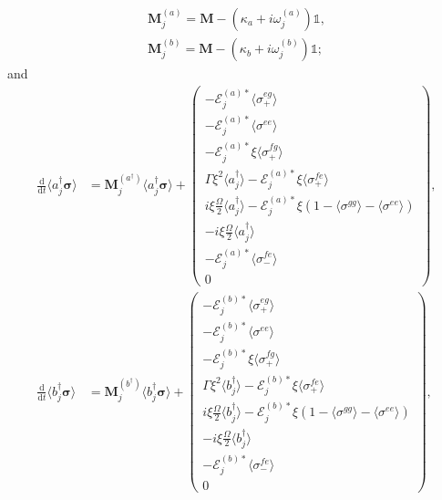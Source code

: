 \documentclass{article}
\newcommand{\ddt}[1][]{\frac{\mathrm{d} #1}{\mathrm{d}t}}
\begin{document}
\begin{subequations}
	\begin{gather}
		\bm{M}^{(a)}_{j} = \bm{M} - \left( \kappa_{a} + i \omega_{j}^{(a)} \right) \mathbb{1}, \\
		\bm{M}^{(b)}_{j} = \bm{M} - \left( \kappa_{b} + i \omega_{j}^{(b)} \right) \mathbb{1};
	\end{gather}
\end{subequations}
and
\begin{subequations}
	\begin{align}
		\ddt \langle a_{j}^{\dagger} \bm{\sigma} \rangle &= \bm{M}_{j}^{(a^{\dagger})} \langle a_{j}^{\dagger} \bm{\sigma} \rangle +
		\begin{pmatrix}
			-\mathcal{E}_{j}^{(a) *} \langle \sigma^{eg}_{+} \rangle \\
			-\mathcal{E}_{j}^{(a) *} \langle \sigma^{ee} \rangle \\
			-\mathcal{E}_{j}^{(a) *} \xi \langle \sigma^{fg}_{+} \rangle \\
			\Gamma \xi^{2} \langle a_{j}^{\dagger} \rangle - \mathcal{E}_{j}^{(a) *} \xi \langle \sigma^{fe}_{+} \rangle \\
			i \xi \frac{\Omega}{2} \langle a_{j}^{\dagger} \rangle - \mathcal{E}_{j}^{(a) *} \xi \left( 1 - \langle \sigma^{gg} \rangle - \langle \sigma^{ee} \rangle \right) \\
			-i \xi \frac{\Omega}{2} \langle a_{j}^{\dagger} \rangle \\
			-\mathcal{E}_{j}^{(a) *} \langle \sigma^{fe}_{-} \rangle \\
			0
		\end{pmatrix} , \\
		\ddt \langle b_{j}^{\dagger} \bm{\sigma} \rangle &= \bm{M}_{j}^{(b^{\dagger})} \langle b_{j}^{\dagger} \bm{\sigma} \rangle +
		\begin{pmatrix}
			-\mathcal{E}_{j}^{(b) *} \langle \sigma^{eg}_{+} \rangle \\
			-\mathcal{E}_{j}^{(b) *} \langle \sigma^{ee} \rangle \\
			-\mathcal{E}_{j}^{(b) *} \xi \langle \sigma^{fg}_{+} \rangle \\
			\Gamma \xi^{2} \langle b_{j}^{\dagger} \rangle - \mathcal{E}_{j}^{(b) *} \xi \langle \sigma^{fe}_{+} \rangle \\
			i \xi \frac{\Omega}{2} \langle b_{j}^{\dagger} \rangle - \mathcal{E}_{j}^{(b) *} \xi \left( 1 - \langle \sigma^{gg} \rangle - \langle \sigma^{ee} \rangle \right) \\
			-i \xi \frac{\Omega}{2} \langle b_{j}^{\dagger} \rangle \\
			-\mathcal{E}_{j}^{(b) *} \langle \sigma^{fe}_{-} \rangle \\
			0
		\end{pmatrix} , \\
	\end{align}
\end{subequations}
\end{document}
